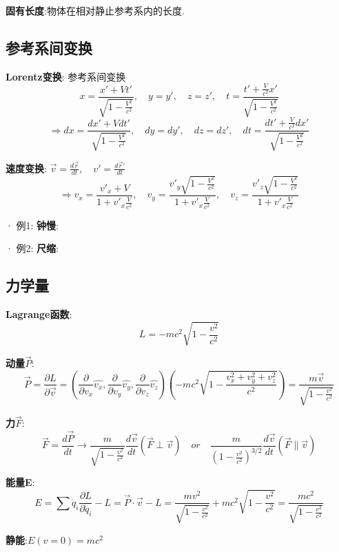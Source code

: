 \documentclass{article}
\begin{document}
        \textbf{固有长度}:物体在相对静止参考系内的长度.


    \subsection{参考系间变换}
        \textbf{Lorentz变换}: 参考系间变换
            $$ x = \frac{x' + V t'}{\sqrt{1 - \frac{V^2}{c^2}}},\quad y=y',\quad z=z', \quad t = \frac{t'+ \frac{V}{c^2}x'}{\sqrt{1 - \frac{V^2}{c^2}}}$$
            $$ \Rightarrow dx = \frac{dx' + V dt'}{\sqrt{1 - \frac{V^2}{c^2}}},\quad dy=dy',\quad dz=dz', \quad dt = \frac{dt'+ \frac{V}{c^2}dx'}{\sqrt{1 - \frac{V^2}{c^2}}}$$
    
        \textbf{速度变换}: $\vec v = \frac{d\vec r}{dt},\quad v' = \frac{d\vec r'}{dt}$
            $$\Rightarrow v_x = \frac{v'_x + V}{1 + v'_x \frac{V}{c^2}}, \quad v_y = \frac{v'_y \sqrt{1 - \frac{V^2}{c^2}}}{1 + v'_x \frac{V}{c^2}},\quad v_z = \frac{v'_z \sqrt{1 - \frac{V^2}{c^2}}}{1 + v'_x \frac{V}{c^2}}$$
            
        · 例1: \textbf{钟慢}:
    
        · 例2: \textbf{尺缩}:


    \subsection{力学量}
        \textbf{Lagrange函数}:
            $$L = -m c^2 \sqrt{1 - \frac{v^2}{c^2}}$$
    
        \textbf{动量$\vec P$}:
            $$\vec P = \frac{\partial L}{\partial \vec v}= (\frac{\partial}{\partial v_x} \hat{v_x}, \frac{\partial}{\partial v_y} \hat{v_y}, \frac{\partial}{\partial v_z} \hat{v_z})(-m c^2 \sqrt{1 - \frac{v_x^2 + v_y^2 + v_z^2}{c^2}}) = \frac{m \vec v}{\sqrt{1 - \frac{v^2}{c^2}}}$$
        
        \textbf{力$\vec F$}:
            $$\vec F = \frac{d\vec P}{dt} \to \frac{m}{\sqrt{1 - \frac{v^2}{c^2}}} \frac{d\vec v}{dt}(\vec F \perp \vec v) \quad or\quad  \frac{m}{(1 - \frac{v^2}{c^2})^{3/2}} \frac{d\vec v}{dt} (\vec F \parallel \vec v)$$
    
        \textbf{能量E}:
            $$E = \sum \dot q_i \frac{\partial L}{\partial \dot q_i} - L = \vec P \cdot \vec v - L = \frac{m v^2}{\sqrt{1 - \frac{v^2}{c^2}}} + m c^2 \sqrt{1 - \frac{v^2}{c^2}} = \frac{mc^2}{\sqrt{1 - \frac{v^2}{c^2}}}$$
    
        \textbf{静能}:\quad $E(v=0) = mc^2$\\
\end{document}
